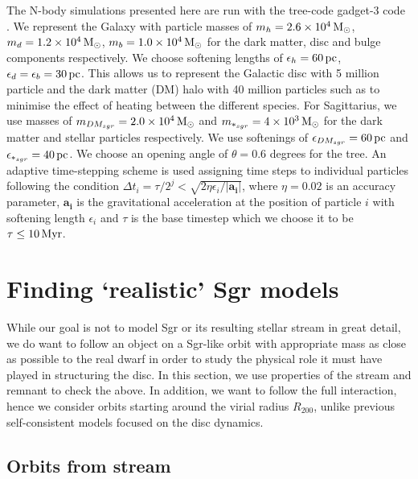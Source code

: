 \documentclass[useAMS,usenatbib]{mnras}
\begin{document}
The N-body simulations presented here are run with the tree-code {\sc gadget-3} code \citep{Springel2005a}. We represent the Galaxy with particle masses of $m_{h}=2.6\times10^{4} \,\rm{M_{\odot}}$, $m_{d}=1.2\times10^{4} \,\rm{M_{\odot}}$, $m_{b}=1.0\times10^4\,\rm{M_{\odot}}$ for the dark matter, disc and bulge components respectively. We choose softening lengths of $\epsilon_{h}=60 \,\rm{pc}$, $\epsilon_{d}=\epsilon_{b}=30\,\rm{pc}$. This allows us to represent the Galactic disc with 5 million particle and the dark matter (DM) halo with 40 million particles such as to minimise the effect of heating between the different species. For Sagittarius, we use masses of $m_{DM_{sgr}}=2.0\times10^{4} \,\rm{M_{\odot}}$ and $m_{*_{sgr}}=4\times10^{3} \,\rm{M_{\odot}}$ for the dark matter and stellar particles respectively. We use softenings of $\epsilon_{DM_{sgr}}=60\,\rm{pc}$ and $\epsilon_{*_{sgr}}=40 \,\rm{pc}$. We choose an opening angle of $\theta=0.6$ degrees for the tree. An adaptive time-stepping scheme is used assigning time steps to individual particles following the condition $\Delta t_{i} =\tau/2^{j}<\sqrt{2\eta \epsilon_{i}/ \left|\mathbf{a_{i}}\right|}$, where $\eta=0.02$ is an accuracy parameter, $\mathbf{a_{i}}$ is the gravitational acceleration at the position of particle $i$ with softening length $\epsilon_{i}$ and $\tau$ is the base timestep which we choose it to be $\tau \le 10\, \rm{Myr}$. 


\section{Finding `realistic' Sgr models}

While our goal is not to model Sgr or its resulting stellar stream in great detail, we do want to follow an object on a Sgr-like orbit with appropriate mass as close as possible to the real dwarf in order to study the physical role it must have played in structuring the disc. In this section, we use properties of the stream and remnant  to check the above. In addition, we want to follow the full interaction, hence we consider orbits starting around the virial radius $R_{200}$, unlike previous self-consistent models focused on the disc dynamics.

\subsection{Orbits from stream}
\end{document}
